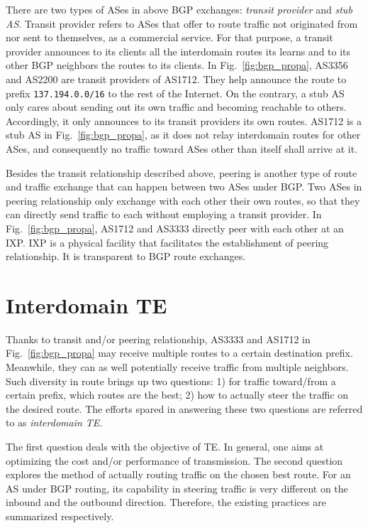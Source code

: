 There are two types of ASes in above BGP exchanges: \textit{transit provider} and \textit{stub AS}.
Transit provider refers to ASes that offer to route traffic not originated from nor sent to themselves, as a commercial service.
For that purpose, a transit provider announces to its clients all the interdomain routes its learns and to its other BGP neighbors the routes to its clients.
In Fig.~\ref{fig:bgp_propa}, AS3356 and AS2200 are transit providers of AS1712. They help announce the route to prefix \texttt{137.194.0.0/16}
to the rest of the Internet.
On the contrary, a stub AS only cares about sending out its own traffic and becoming reachable to others.
Accordingly, it only announces to its transit providers its own routes. AS1712 is a stub AS in Fig.~\ref{fig:bgp_propa}, as it does not relay interdomain routes for other ASes, and consequently no traffic toward ASes other than itself shall arrive at it.

Besides the transit relationship described above, peering is another type of route and traffic exchange that can happen between two ASes under BGP. Two ASes in peering relationship only exchange with each other their own routes, so that they can directly send traffic to each  without employing a transit provider.
In Fig.~\ref{fig:bgp_propa}, AS1712 and AS3333 directly peer with each other at an \acf{IXP}.
\ac{IXP} is a physical facility that facilitates the establishment of peering relationship. It is transparent to BGP route exchanges.

\section{Interdomain \acf{TE}}
Thanks to transit and/or peering relationship, AS3333 and AS1712 in Fig.~\ref{fig:bgp_propa} may receive multiple routes to a certain destination prefix. Meanwhile, they can as well potentially receive traffic from multiple neighbors.
Such diversity in route brings up two questions: 1) for traffic toward/from a certain prefix, which routes are the best; 2) how to actually steer the traffic on the desired route.
The efforts spared in answering these two questions are referred to as \textit{interdomain \ac{TE}}.

The first question deals with the objective of \ac{TE}. In general, one aims at optimizing the cost and/or performance of transmission.
The second question explores the method of actually routing traffic on the chosen best route. For an AS under BGP routing, its capability in steering traffic is very different on the inbound and the outbound direction. Therefore, the existing practices are summarized respectively.

